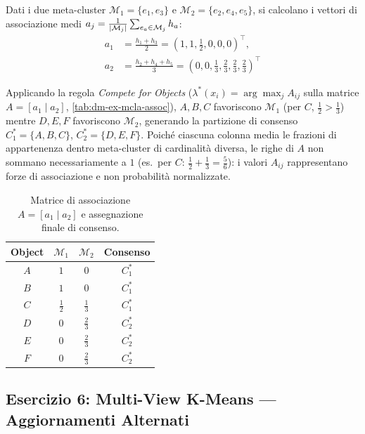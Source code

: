 Dati i due meta-cluster $\mathcal{M}_1 = \{e_1, e_3\}$ e $\mathcal{M}_2 = \{e_2, e_4, e_5\}$, si calcolano i vettori di associazione medi $a_j = \frac{1}{\left|\mathcal{M}_j\right|} \sum_{e_a \in \mathcal{M}_j} h_a$:
\begin{align*}
    a_1 &= \frac{h_1 + h_3}{2} = \left(1, 1, \frac{1}{2}, 0, 0, 0\right)^\top, \\
    a_2 &= \frac{h_2 + h_4 + h_5}{3} = \left(0, 0, \frac{1}{3}, \frac{2}{3}, \frac{2}{3}, \frac{2}{3}\right)^\top
\end{align*}

Applicando la regola \textit{Compete for Objects} ($\lambda^*(x_i) = \arg\max_j A_{ij}$ sulla matrice $A = [a_1 \mid a_2]$, \autoref{tab:dm-ex-mcla-assoc}), $A, B, C$ favoriscono $\mathcal{M}_1$ (per $C$, $\frac{1}{2} > \frac{1}{3}$) mentre $D, E, F$ favoriscono $\mathcal{M}_2$, generando la partizione di consenso $C_1^* = \{A,B,C\}$, $C_2^* = \{D,E,F\}$. Poich\'e ciascuna colonna media le frazioni di appartenenza dentro meta-cluster di cardinalit\`a diversa, le righe di $A$ non sommano necessariamente a $1$ (es.\ per $C$: $\frac{1}{2} + \frac{1}{3} = \frac{5}{6}$): i valori $A_{ij}$ rappresentano forze di associazione e non probabilit\`a normalizzate.

\begin{table}[H]
\centering
\caption{Matrice di associazione $A = [a_1 \mid a_2]$ e assegnazione finale di consenso.}
\label{tab:dm-ex-mcla-assoc}
\small
\begin{tabular}{cccc}
\toprule
\textbf{Object} & $\mathcal{M}_1$ & $\mathcal{M}_2$ & \textbf{Consenso} \\
\midrule
$A$ & $1$           & $0$           & $C_1^*$ \\
$B$ & $1$           & $0$           & $C_1^*$ \\
$C$ & $\frac{1}{2}$ & $\frac{1}{3}$ & $C_1^*$ \\
$D$ & $0$           & $\frac{2}{3}$ & $C_2^*$ \\
$E$ & $0$           & $\frac{2}{3}$ & $C_2^*$ \\
$F$ & $0$           & $\frac{2}{3}$ & $C_2^*$ \\
\bottomrule
\end{tabular}
\end{table}

\FloatBarrier
\subsection{Esercizio 6: Multi-View K-Means --- Aggiornamenti Alternati}
\label{sec:dm-ex-mv-kmeans}

